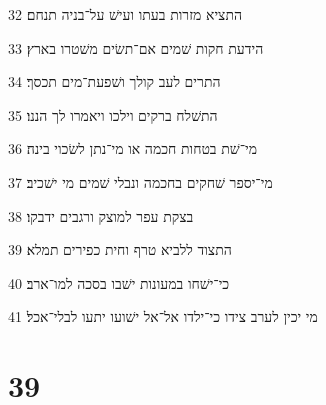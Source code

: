 \par 32 התציא מזרות בעתו ועישׁ על־בניה תנחם׃
\par 33 הידעת חקות שׁמים אם־תשׂים משׁטרו בארץ׃
\par 34 התרים לעב קולך ושׁפעת־מים תכסך׃
\par 35 התשׁלח ברקים וילכו ויאמרו לך הננו׃
\par 36 מי־שׁת בטחות חכמה או מי־נתן לשׂכוי בינה׃
\par 37 מי־יספר שׁחקים בחכמה ונבלי שׁמים מי ישׁכיב׃
\par 38 בצקת עפר למוצק ורגבים ידבקו׃
\par 39 התצוד ללביא טרף וחית כפירים תמלא׃
\par 40 כי־ישׁחו במעונות ישׁבו בסכה למו־ארב׃
\par 41 מי יכין לערב צידו כי־ילדו אל־אל ישׁועו יתעו לבלי־אכל׃

\chapter{39}

